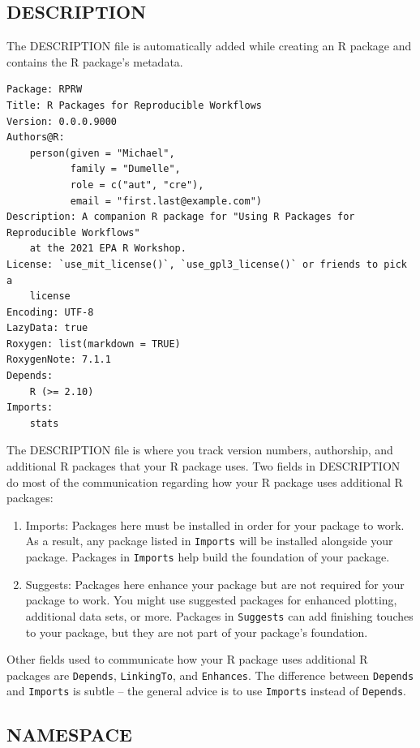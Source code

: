 \documentclass[
]{book}
\begin{document}
\hypertarget{description}{%
\subsection{DESCRIPTION}\label{description}}

The DESCRIPTION file is automatically added while creating an R package and contains the R package's metadata.

\begin{verbatim}
Package: RPRW
Title: R Packages for Reproducible Workflows
Version: 0.0.0.9000
Authors@R: 
    person(given = "Michael",
           family = "Dumelle",
           role = c("aut", "cre"),
           email = "first.last@example.com")
Description: A companion R package for "Using R Packages for Reproducible Workflows"
    at the 2021 EPA R Workshop.
License: `use_mit_license()`, `use_gpl3_license()` or friends to pick a
    license
Encoding: UTF-8
LazyData: true
Roxygen: list(markdown = TRUE)
RoxygenNote: 7.1.1
Depends: 
    R (>= 2.10)
Imports: 
    stats
\end{verbatim}

The DESCRIPTION file is where you track version numbers, authorship, and additional R packages that your R package uses. Two fields in DESCRIPTION do most of the communication regarding how your R package uses additional R packages:

\begin{enumerate}
\def\labelenumi{\arabic{enumi}.}
\item
  Imports: Packages here must be installed in order for your package to work. As a result, any package listed in \texttt{Imports} will be installed alongside your package. Packages in \texttt{Imports} help build the foundation of your package.
\item
  Suggests: Packages here enhance your package but are not required for your package to work. You might use suggested packages for enhanced plotting, additional data sets, or more. Packages in \texttt{Suggests} can add finishing touches to your package, but they are not part of your package's foundation.
\end{enumerate}

Other fields used to communicate how your R package uses additional R packages are \texttt{Depends}, \texttt{LinkingTo}, and \texttt{Enhances}. The difference between \texttt{Depends} and \texttt{Imports} is subtle -- the general advice is to use \texttt{Imports} instead of \texttt{Depends}.

\hypertarget{namespace}{%
\subsection{NAMESPACE}\label{namespace}}
\end{document}

